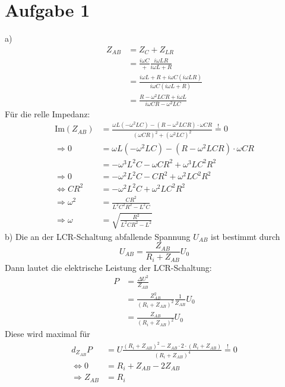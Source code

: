 \documentclass[11pt a4paper]{article}
\newcommand{\omegaC}{\omega C}
\newcommand{\omegaL}{\omega L}
\newcommand{\omegaCR}{\omega CR}
\begin{document}
\thispagestyle{fancy}

\section*{Aufgabe 1}
a) 
\begin{align*}
	Z_{AB}
	&= Z_C + Z_{LR} \\
	&= \frac{i\omega C} + \frac{i\omega LR}{i \omega L + R} \\
	&= \frac{i \omega L + R + i \omega C (i \omega LR)}{i \omegaC (i\omegaL + R)} \\
	&= \frac{R - \omega^2 LCR + i \omega L}{i\omega CR - \omega^2 LC}
\end{align*}
Für die relle Impedanz:
\begin{align*}
	\text{Im} \left( Z_{AB} \right)
	&= \frac{\omega L (- \omega^2 LC) - (R - \omega^2 LCR) \cdot \omegaCR}{(\omega CR)^2 + (\omega^2 LC)^2} 
	\overset{!}{=} 0 \\
	\Rightarrow
	0
	&= \omega L (- \omega^2 LC) - (R - \omega^2 LCR) \cdot \omegaCR \\
	&= -\omega^3 L^2 C - \omega CR^2 + \omega^3 LC^2R^2 \\
	\Rightarrow
	0
	&= -\omega^2 L^2 C - CR^2 + \omega^2 LC^2R^2 \\
	\Leftrightarrow
	CR^2
	&= -\omega^2 L^2 C + \omega^2 LC^2R^2 \\
	\Rightarrow
	\omega^2
	&= \frac{CR^2}{L^2C^2R^2 - L^2C} \\
	\Rightarrow
	\omega
	&= \sqrt{\frac{R^2}{L^2CR^2 - L^2}}
\end{align*}
b) Die an der LCR-Schaltung abfallende Spannung $U_{AB}$ ist bestimmt durch
\[ U_{AB} = \frac{Z_{AB}}{R_i + Z_{AB}} U_0 \]
Dann lautet die elektrische Leistung der LCR-Schaltung:
\begin{align*}
	P
	&= \frac{\Delta U^2}{Z_{AB}} \\
	&= \frac{Z_{AB}^2}{(R_i+Z_{AB})^2} \frac{1}{Z_{AB}} U_0 \\
	&= \frac{Z_{AB}}{(R_i+Z_{AB})^2} U_0 
\end{align*}
Diese wird maximal für
\begin{align*}
	d_{Z_{AB}} P
	&= U \frac{(R_i+Z_{AB})^2 - Z_{AB} \cdot 2 \cdot (R_i + Z_{AB})}{(R_i+Z_{AB})^4} \overset != 0 \\
	\Leftrightarrow
	0
	&= R_i + Z_{AB} - 2 Z_{AB} \\
	\Rightarrow
	Z_{AB} &= R_i
\end{align*}
\end{document}
